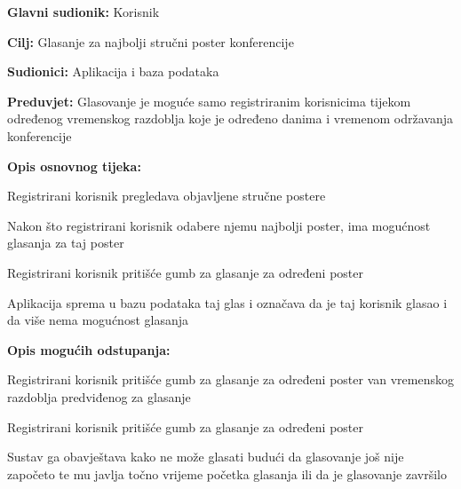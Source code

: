 				
				\noindent {}
				\begin{packed_item}
					
					\item \textbf{Glavni sudionik: }Korisnik
					\item  \textbf{Cilj:} Glasanje za najbolji stručni poster konferencije
					\item  \textbf{Sudionici:} Aplikacija i baza podataka
					\item  \textbf{Preduvjet:} Glasovanje je moguće samo registriranim korisnicima tijekom određenog vremenskog razdoblja koje je određeno danima i vremenom održavanja konferencije
					\item  \textbf{Opis osnovnog tijeka:}
					
					\item[] \begin{packed_enum}
						
						\item Registrirani korisnik pregledava objavljene stručne postere
						\item Nakon što registrirani korisnik odabere njemu najbolji poster, ima mogućnost glasanja za taj poster
						\item Registrirani korisnik pritišće gumb za glasanje za određeni poster
						\item Aplikacija sprema u bazu podataka taj glas i označava da je taj korisnik glasao i da više nema mogućnost glasanja

					\end{packed_enum}
					
					\item  \textbf{Opis mogućih odstupanja:}
					
					\item[] \begin{packed_item}
						
						\item[3.a] Registrirani korisnik pritišće gumb za glasanje za određeni poster van vremenskog razdoblja predviđenog za glasanje
						\item[] \begin{packed_enum}
							
							\item Registrirani korisnik pritišće gumb za glasanje za određeni poster
							\item Sustav ga obavještava kako ne može glasati budući da glasovanje još nije započeto te mu javlja točno vrijeme početka glasanja ili da je glasovanje završilo
							

\end{packed_enum}
\end{packed_item}
\end{packed_item}
